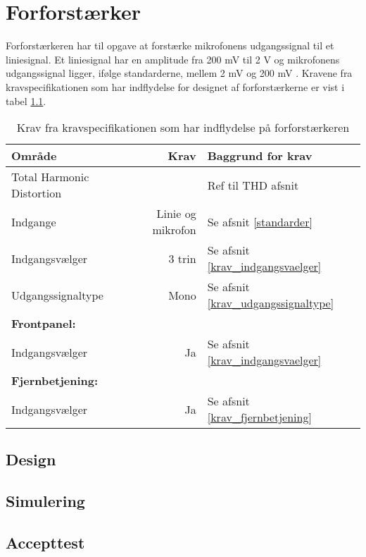 \chapter{Forforstærker}

Forforstærkeren har til opgave at forstærke mikrofonens udgangssignal til et liniesignal. Et liniesignal har en amplitude fra 200 mV til 2 V og mikrofonens udgangssignal ligger, ifølge standarderne, mellem 2 mV og 200 mV . 
Kravene fra kravspecifikationen som har indflydelse for designet af forforstærkerne er vist i tabel \ref{tab:krav_forforstaerker}.

\begin{table}[h]
\centering
\begin{tabular}{l|r|l}
\hline\hline
Område & Krav & Baggrund for krav \\
\hline\hline
Total Harmonic Distortion & \color{red}{<1 \%} & Ref til THD afsnit \\
Indgange & Linie og mikrofon & Se afsnit \ref{standarder} \\
Indgangsvælger & 3 trin & Se afsnit \ref{krav_indgangsvaelger} \\
Udgangssignaltype & Mono & Se afsnit \ref{krav_udgangssignaltype} \\
\textbf{Frontpanel:} & & \\
Indgangsvælger & Ja & Se afsnit \ref{krav_indgangsvaelger} \\
\textbf{Fjernbetjening:} & & \\
Indgangsvælger & Ja &  Se afsnit \ref{krav_fjernbetjening}\\
\hline\hline
\end{tabular}
\caption{Krav fra kravspecifikationen som har indflydelse på forforstærkeren}
\label{tab:krav_forforstaerker}
\end{table}


\section{Design}


\section{Simulering}


\section{Accepttest}

